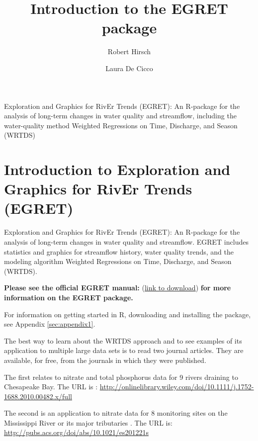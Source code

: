 \documentclass[a4paper,11pt]{article}\usepackage{graphicx, color}
\begin{document}
\title{Introduction to the EGRET package}
\author[1]{Robert Hirsch}
\author[1]{Laura De Cicco}

\maketitle

Exploration and Graphics for RivEr Trends (EGRET): An R-package for the analysis of long-term changes in water quality and streamflow, including the water-quality method Weighted Regressions on Time, Discharge, and Season (WRTDS)

\tableofcontents

\section{Introduction to Exploration and Graphics for RivEr Trends (EGRET)}

Exploration and Graphics for RivEr Trends (EGRET): An R-package for the analysis of long-term changes in water quality and streamflow. EGRET includes statistics and graphics for streamflow history, water quality trends, and the modeling algorithm Weighted Regressions on Time, Discharge, and Season (WRTDS). 


\textbf{Please see the official EGRET manual:}
(\href{https://github.com/USGS-R/EGRET/raw/Documentation/EGRET%2Bmanual_4.doc}{link to download}) 
\textbf{for more information on the EGRET package.}

For information on getting started in R, downloading and installing the package, see Appendix \ref{sec:appendix1}.

The best way to learn about the WRTDS approach and to see examples of its application to multiple large data sets is to read two journal articles.  They are available, for free, from the journals in which they were published.

The first relates to nitrate and total phosphorus data for 9 rivers draining to Chesapeake Bay.  The URL is \cite{HirschII}: 
\url{http://onlinelibrary.wiley.com/doi/10.1111/j.1752-1688.2010.00482.x/full}

The second is an application  to nitrate data for 8 monitoring sites on the Mississippi River or its major tributaries \cite{HirschIII}.  The URL is: \url{http://pubs.acs.org/doi/abs/10.1021/es201221s}
\end{document}
